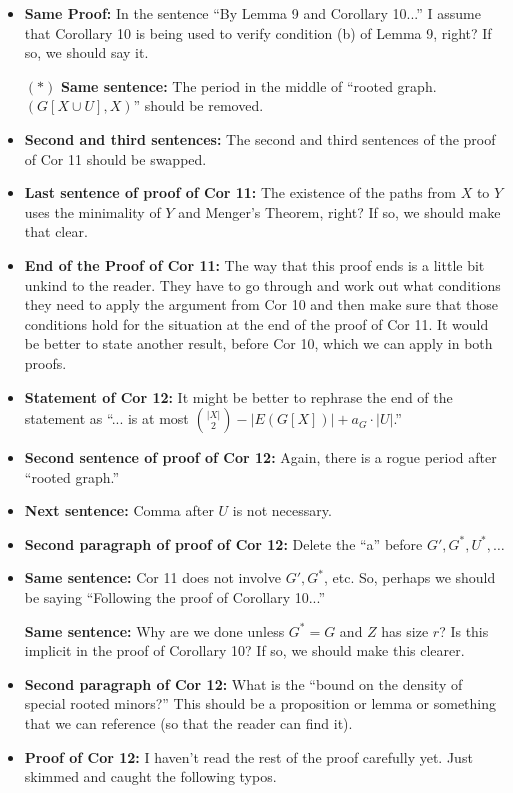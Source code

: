 \documentclass[11 pt]{article}
\theoremstyle{definition}
\theoremstyle{case}
\numberwithin{equation}{section}
\begin{document}
\begin{itemize}
\item \textbf{Same Proof:} In the sentence ``By Lemma 9 and Corollary 10...'' I assume that Corollary 10 is being used to verify condition (b) of Lemma 9, right? If so, we should say it. 
\item[$\boldsymbol{(*)}$] \textbf{Same sentence:} The period in the middle of ``rooted graph. $(G[X\cup U],X)$'' should be removed.
\item \textbf{Second and third sentences:} The second and third sentences of the proof of Cor 11 should be swapped. 
\item \textbf{Last sentence of proof of Cor 11:} The existence of the paths from $X$ to $Y$ uses the minimality of $Y$ and Menger's Theorem, right? If so, we should make that clear. 
\item\textbf{End of the Proof of Cor 11:} The way that this proof ends is a little bit unkind to the reader. They have to go through and work out what conditions they need to apply the argument from Cor 10 and then make sure that those conditions hold for the situation at the end of the proof of Cor 11. It would be better to state another result, before Cor 10, which we can apply in both proofs. 
\item \textbf{Statement of Cor 12:} It might be better to rephrase the end of the statement as ``... is at most $\binom{|X|}{2} - |E(G[X])| + a_G\cdot |U|$.'' 
\item \textbf{Second sentence of proof of Cor 12:} Again, there is a rogue period after ``rooted graph.''
\item \textbf{Next sentence:} Comma after $U$ is not necessary. 
\item \textbf{Second paragraph of proof of Cor 12:} Delete the ``a'' before $G',G^*,U^*,\dots$
\item \textbf{Same sentence:} Cor 11 does not involve $G',G^*$, etc. So, perhaps we should be saying ``Following the proof of Corollary 10...''
\item[\color{red}{$\boldsymbol{(**)}$}] \textbf{Same sentence:} Why are we done unless $G^*=G$ and $Z$ has size $r$? Is this implicit in the proof of Corollary 10? If so, we should make this clearer. 
\item \textbf{Second paragraph of Cor 12:} What is the ``bound on the density of special rooted minors?'' This should be a proposition or lemma or something that we can reference (so that the reader can find it).
\item \textbf{Proof of Cor 12:} I haven't read the rest of the proof carefully yet. Just skimmed and caught the following typos. 

\end{itemize}
\end{document}
